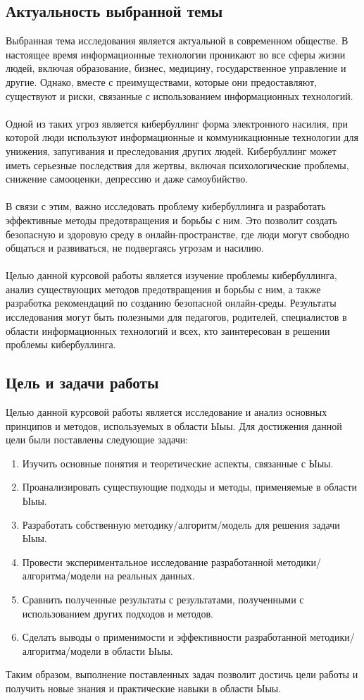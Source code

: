 \documentclass{article}
\begin{document}
\subsection{Актуальность выбранной темы}
Выбранная тема исследования является актуальной в современном обществе. В настоящее время информационные технологии проникают во все сферы жизни людей, включая образование, бизнес, медицину, государственное управление и другие. Однако, вместе с преимуществами, которые они предоставляют, существуют и риски, связанные с использованием информационных технологий.\\
~\\
Одной из таких угроз является кибербуллинг  форма электронного насилия, при которой люди используют информационные и коммуникационные технологии для унижения, запугивания и преследования других людей. Кибербуллинг может иметь серьезные последствия для жертвы, включая психологические проблемы, снижение самооценки, депрессию и даже самоубийство.\\
~\\
В связи с этим, важно исследовать проблему кибербуллинга и разработать эффективные методы предотвращения и борьбы с ним. Это позволит создать безопасную и здоровую среду в онлайн-пространстве, где люди могут свободно общаться и развиваться, не подвергаясь угрозам и насилию.\\
~\\
Целью данной курсовой работы является изучение проблемы кибербуллинга, анализ существующих методов предотвращения и борьбы с ним, а также разработка рекомендаций по созданию безопасной онлайн-среды. Результаты исследования могут быть полезными для педагогов, родителей, специалистов в области информационных технологий и всех, кто заинтересован в решении проблемы кибербуллинга.
\subsection{Цель и задачи работы}
Целью данной курсовой работы является исследование и анализ основных принципов и методов, используемых в области Ыыы. Для достижения данной цели были поставлены следующие задачи:
\begin{enumerate}
\item Изучить основные понятия и теоретические аспекты, связанные с Ыыы.
\item Проанализировать существующие подходы и методы, применяемые в области Ыыы.
\item Разработать собственную методику/алгоритм/модель для решения задачи Ыыы.
\item Провести экспериментальное исследование разработанной методики/алгоритма/модели на реальных данных.
\item Сравнить полученные результаты с результатами, полученными с использованием других подходов и методов.
\item Сделать выводы о применимости и эффективности разработанной методики/алгоритма/модели в области Ыыы.
\end{enumerate}
Таким образом, выполнение поставленных задач позволит достичь цели работы и получить новые знания и практические навыки в области Ыыы.\\
~\\
\end{document}
